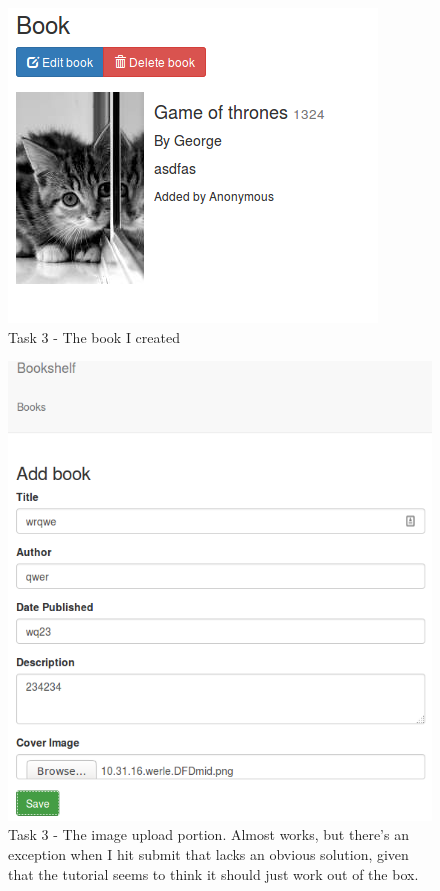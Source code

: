 \documentclass{article}
\makeatletter
\def\maxwidth#1{\ifdim\Gin@nat@width>#1 #1\else\Gin@nat@width\fi}
\makeatother
\begin{document}
	\begin{figure}[ht]
		\includegraphics[width=\maxwidth{5in}]{img/t3s3.png}
		\centering
        \caption{Task 3 - The book I created}
	\end{figure}
	\begin{figure}[ht]
		\includegraphics[width=\maxwidth{5in}]{img/t3s4.png}
		\centering
		\caption{Task 3 - The image upload portion. Almost works, but there's an exception when I hit submit that lacks an obvious solution, given that the tutorial seems to think it should just work out of the box.}
	\end{figure}
\end{document}

